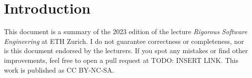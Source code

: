 \section{Introduction}

This document is a summary of the 2023 edition of the lecture \textit{Rigorous Software Engineering} at ETH Zurich. I do not guarantee correctness or completeness, nor is this document endorsed by the lecturers. If you spot any mistakes or find other improvements, feel free to open a pull request at TODO: INSERT LINK. This work is published as CC BY-NC-SA.
\begin{center}
	\ccbyncsa
\end{center}